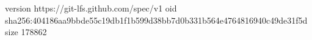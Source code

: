 version https://git-lfs.github.com/spec/v1
oid sha256:404186aa9bbde55c19db1f1b599d38bb7d0b331b564e4764816940c49de31f5d
size 178862
